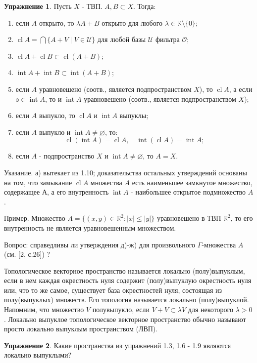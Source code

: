 \documentclass[a4paper, 12pt]{article}
\theoremstyle{definition}
\newtheorem{problem}{Упражнение}[section]
\theoremstyle{remark}
\DeclareMathOperator{\Int}{int}
\DeclareMathOperator{\clo}{cl}
\begin{document}
\begin{problem}
    Пусть $X$ - ТВП. $A, B \subset X$. Тогда:
    \begin{enumerate}
        \item если $A$ открыто, то $\lambda A + B$ открыто для любого $\lambda \in \mathbb{K} \setminus \{0\}$;
        \item $\clo A = \bigcap \{A + V \; | \; V\in \mathcal U\}$ для любой базы $\mathcal U$ фильтра $\mathcal O$;
        \item $\clo A + \clo B \subset \clo (A+B)$;
        \item $\Int A + \Int B \subset \Int (A+B)$;
        \item если $A$ уравновешено (соотв., является подпространством $X$), то $\clo A$, а если $\mathbb o \in \Int A$, то и $\Int A$ уравновешено (соотв., является подпространством $X$);
        \item если $A$ выпукло, то $\clo A$ и $\Int A$ выпуклы;
        \item если $A$ выпукло и $\Int A\neq \varnothing$, то:
        \[\clo (\Int A) = \clo A, \quad \Int (\clo A) = \Int A;\]
        \item если $A$ - подпространство $X$ и $\Int A\neq \varnothing$, то $A = X$.
    \end{enumerate}
    Указание. а) вытекает из 1.10; доказательства остальных утверждений основаны на том, что замыкание $\clo A$ множества $A$ есть наименьшее замкнутое множество, содержащее $А$, а его внутренность $\Int A$ - наибольшее открытое подмножество $A$.

    Пример. Множество $A = \{(x, y)\in \mathbb{R}^2 : |x|\le |y|\}$ уравновешено в ТВП $\mathbb{R}^2$, то его внутренность не является уравновешенным множеством.

    Вопрос: справедливы ли утверждения д)-ж) для произвольного $\Gamma$-множества $A$ (см. [2, с.26]) ?
\end{problem}
Топологическое векторное пространство называется локально
(полу)выпуклым, если в нем каждая окрестность нуля содержит (полу)выпуклую
окрестность нуля или, что то же самое, существует
база окрестностей нуля, состоящая из полу(выпуклых) множеств.
Его топология называется локально (полу)выпуклой. Напомним,
что множество $V$ полувыпукло, если $V+V\subset \lambda V$ для
некоторого $\lambda > 0$. Локально выпуклое топологическое
векторное пространство обычно называют просто
локально выпуклым пространством (ЛВП).
\begin{problem}
 Какие пространства из упражнений 1.3, 1.6 - 1.9 являются локально выпуклыми?
\end{problem}
\end{document}
